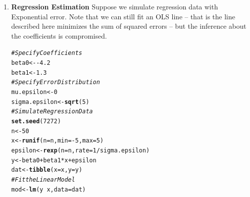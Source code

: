 \documentclass{article}\usepackage[]{graphicx}\usepackage[]{xcolor}
\makeatletter
\newcommand{\hlnum}[1]{\textcolor[rgb]{0.686,0.059,0.569}{#1}}%
\newcommand{\hlcom}[1]{\textcolor[rgb]{0.678,0.584,0.686}{\textit{#1}}}%
\newcommand{\hlopt}[1]{\textcolor[rgb]{0,0,0}{#1}}%
\newcommand{\hldef}[1]{\textcolor[rgb]{0.345,0.345,0.345}{#1}}%
\newcommand{\hlkwb}[1]{\textcolor[rgb]{0.69,0.353,0.396}{#1}}%
\newcommand{\hlkwc}[1]{\textcolor[rgb]{0.333,0.667,0.333}{#1}}%
\newcommand{\hlkwd}[1]{\textcolor[rgb]{0.737,0.353,0.396}{\textbf{#1}}}%
\newenvironment{kframe}{%
 \def\at@end@of@kframe{}%
 \ifinner\ifhmode%
  \def\at@end@of@kframe{\end{minipage}}%
  \begin{minipage}{\columnwidth}%
 \fi\fi%
 \def\FrameCommand##1{\hskip\@totalleftmargin \hskip-\fboxsep
 \colorbox{shadecolor}{##1}\hskip-\fboxsep
     \hskip-\linewidth \hskip-\@totalleftmargin \hskip\columnwidth}%
 \MakeFramed {\advance\hsize-\width
   \@totalleftmargin\z@ \linewidth\hsize
   \@setminipage}}%
 {\par\unskip\endMakeFramed%
 \at@end@of@kframe}
\newenvironment{knitrout}{}{} %
\makeatother
\begin{document}
\begin{enumerate}
\begin{tcolorbox}[breakable]
Quick Check:
Can you briefly explain what “homoscedasticity” means and why it matters for OLS regression?
  \end{tcolorbox}
  \begin{tcolorbox}[breakable]
    \textbf{Me:} Homoscedasticity refers to having a constant random dispersion of residuals across observations and not showing any dependence on the explanatory variable (x). It matters for OLS regression because if you had heteroscedasticity and had a distinct pattern of residuals dependent on x values, that could give indication that the observations are not independent of each other or that the model is not linear, meaning that the residuals would not be gaussian distributed.
  \end{tcolorbox}
  \item \textbf{Regression Estimation} Suppose we simulate regression data with 
  Exponential error. Note that we can still fit an OLS line -- that is the line 
  described here minimizes the sum of squared errors -- but the inference about 
  the coefficients is compromised.
\begin{knitrout}\scriptsize
{}\color{fgcolor}\begin{kframe}
\begin{alltt}
\hlcom{# Specify Coefficients}
\hldef{beta0} \hlkwb{<-} \hlopt{-}\hlnum{4.2}
\hldef{beta1} \hlkwb{<-} \hlnum{1.3}
\hlcom{# Specify Error Distribution}
\hldef{mu.epsilon} \hlkwb{<-} \hlnum{0}
\hldef{sigma.epsilon}\hlkwb{<-}\hlkwd{sqrt}\hldef{(}\hlnum{5}\hldef{)}
\hlcom{# Simulate Regression Data}
\hlkwd{set.seed}\hldef{(}\hlnum{7272}\hldef{)}
\hldef{n} \hlkwb{<-} \hlnum{50}
\hldef{x} \hlkwb{<-} \hlkwd{runif}\hldef{(}\hlkwc{n}\hldef{=n,} \hlkwc{min}\hldef{=}\hlopt{-}\hlnum{5}\hldef{,} \hlkwc{max}\hldef{=}\hlnum{5}\hldef{)}
\hldef{epsilon} \hlkwb{<-} \hlkwd{rexp}\hldef{(}\hlkwc{n}\hldef{=n,} \hlkwc{rate} \hldef{=} \hlnum{1}\hlopt{/}\hldef{sigma.epsilon)}
\hldef{y} \hlkwb{<-} \hldef{beta0} \hlopt{+} \hldef{beta1}\hlopt{*}\hldef{x} \hlopt{+} \hldef{epsilon}
\hldef{dat} \hlkwb{<-} \hlkwd{tibble}\hldef{(}\hlkwc{x}\hldef{=x,} \hlkwc{y}\hldef{=y)}
\hlcom{# Fit the Linear Model}
\hldef{mod} \hlkwb{<-} \hlkwd{lm}\hldef{(y} \hlopt{~} \hldef{x,} \hlkwc{data}\hldef{=dat)}

\end{alltt}
\end{kframe}
\end{knitrout}
\end{enumerate}
\end{document}
